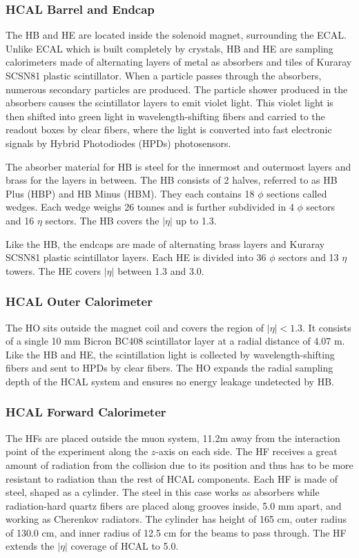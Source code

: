 \subsubsection{HCAL Barrel and Endcap}
The HB and HE are located inside the solenoid magnet, surrounding the ECAL. Unlike ECAL which is built completely by crystals, HB and HE are sampling calorimeters made of alternating layers of metal as absorbers and tiles of Kuraray SCSN81 plastic scintillator. When a particle passes through the absorbers, numerous secondary particles are produced. The particle shower produced in the absorbers causes the scintillator layers to emit violet light. This violet light is then shifted into green light in wavelength-shifting fibers and carried to the readout boxes by clear fibers, where the light is converted into fast electronic signals by Hybrid Photodiodes (HPDs) photosensors.

\vspace{0.3cm}
The absorber material for HB is steel for the innermost and outermost layers and brass for the layers in between. The HB consists of 2 halves, referred to as HB Plus (HBP) and HB Minus (HBM). They each contains 18 $\phi$ sections called wedges. Each wedge weighs 26 tonnes and is further subdivided in 4 $\phi$ sectors and 16 $\eta$ sectors. The HB covers the $|\eta|$ up to 1.3.

\vspace{0.3cm}
Like the HB, the endcaps are made of alternating brass layers and Kuraray SCSN81 plastic scintillator layers. Each HE is divided into 36 $\phi$ sectors and 13 $\eta$ towers. The HE covers $|\eta|$ between 1.3 and 3.0.

\subsubsection{HCAL Outer Calorimeter}
The HO sits outside the magnet coil and covers the region of $|\eta|<1.3$. It consists of a single 10 mm Bicron BC408 scintillator layer at a radial distance of 4.07 m. Like the HB and HE, the scintillation light is collected by wavelength-shifting fibers and sent to HPDs by clear fibers. The HO expands the radial sampling depth of the HCAL system and ensures no energy leakage undetected by HB.

\subsubsection{HCAL Forward Calorimeter}
The HFs are placed outside the muon system, 11.2m away from the interaction point of the experiment along the $z$-axis on each side. The HF receives a great amount of radiation from the collision due to its position and thus has to be more resistant to radiation than the rest of HCAL components. Each HF is made of steel, shaped as a cylinder. The steel in this case works as absorbers while radiation-hard quartz fibers are placed along grooves inside, 5.0 mm apart, and working as Cherenkov radiators. The cylinder has height of 165 cm, outer radius of 130.0 cm, and inner radius of 12.5 cm for the beams to pass through. The HF extends the $|\eta|$ coverage of HCAL to 5.0.

